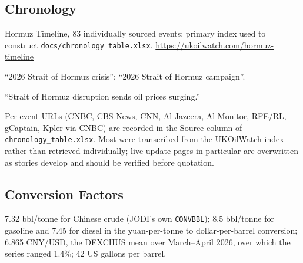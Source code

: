 \documentclass[11pt]{article}
\begin{document}
\subsection*{Chronology}
\begin{description}[leftmargin=0.9em,style=nextline,itemsep=0.2em,parsep=0pt,topsep=0.2em]
\item[UKOilWatch] Hormuz Timeline, 83 individually sourced events; primary index used
to construct \texttt{docs/chronology\_table.xlsx}.
\url{https://ukoilwatch.com/hormuz-timeline}
\item[Wikipedia] ``2026 Strait of Hormuz crisis''; ``2026 Strait of Hormuz campaign''.
\item[World Bank Data Blog] ``Strait of Hormuz disruption sends oil prices surging.''
\item[News reporting] Per-event URLs (CNBC, CBS News, CNN, Al Jazeera, Al-Monitor,
RFE/RL, gCaptain, Kpler via CNBC) are recorded in the Source column of
\texttt{chronology\_table.xlsx}. Most were transcribed from the UKOilWatch index
rather than retrieved individually; live-update pages in particular are overwritten
as stories develop and should be verified before quotation.
\end{description}

\subsection*{Conversion Factors}
7.32 bbl/tonne for Chinese crude (JODI's own \texttt{CONVBBL}); 8.5 bbl/tonne for
gasoline and 7.45 for diesel in the yuan-per-tonne to dollar-per-barrel conversion;
6.865 CNY/USD, the DEXCHUS mean over March--April 2026, over which the series ranged
1.4\%; 42 US gallons per barrel.
\end{document}
